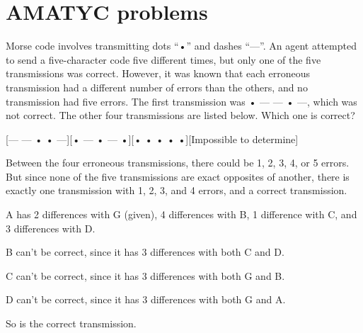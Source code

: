 



\parindent 0pt
\marginparsep 3pt




\sloppy
\thispagestyle{firstpageheader}

\section*{AMATYC problems}

\begin{problem}
     Morse code involves transmitting dots “•” and dashes “\textsf{---}”. An agent attempted to send a five-character code five different times, but only one of the five transmissions was correct. However, it was known that each erroneous transmission had a different number of errors than the others, and no transmission had five errors. The first transmission was • \textsf{---} \textsf{---} • \textsf{---}, which was not correct. The other four transmissions are listed below. Which one is correct? 
\end{problem}
[\textsf{---} \textsf{---} • • \textsf{---}][• \textsf{---} • \textsf{---} •][• • • • •][Impossible to determine]

\begin{solution}[A]
    Between the four erroneous transmissions, there could be 1, 2, 3, 4, or 5 errors. But since none of the five transmissions are exact opposites of another, there is exactly one transmission with 1, 2, 3, and 4 errors, and a correct transmission. 
    
    A has 2 differences with G (given), 4 differences with B, 1 difference with C, and 3 differences with D.

    B can't be correct, since it has 3 differences with both C and D.

    C can't be correct, since it has 3 differences with both G and B.

    D can't be correct, since it has 3 differences with both G and A.

    So  is the correct transmission.
\end{solution}

